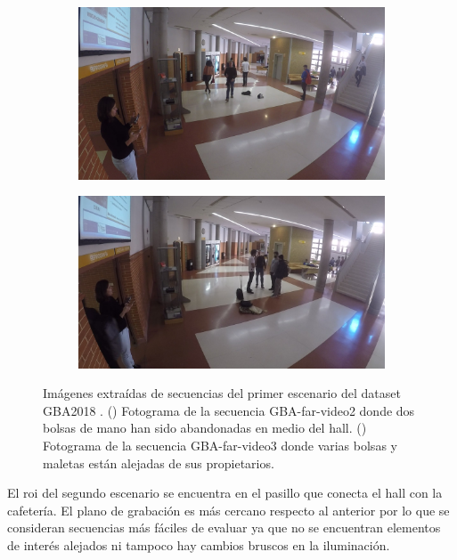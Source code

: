 \begin{figure}[ht!]
  \centering
  \begin{subfigure}[b]{0.4\textwidth}
    \includegraphics[width=\textwidth]{img/chapters/resultados/datasets/GBA_1.jpg}
    \caption{}
    \label{fig:GBA_1}
  \end{subfigure}
  \qquad\qquad
  \begin{subfigure}[b]{0.4\textwidth}
    \includegraphics[width=\textwidth]{img/chapters/resultados/datasets/GBA_2.jpg}
    \caption{}
    \label{fig:GBA_2}
  \end{subfigure}
  \caption{Imágenes extraídas de secuencias del primer escenario del dataset GBA2018 \cite{gba-dataset}.
    (\protect{}) Fotograma de la secuencia GBA-far-video2 donde dos bolsas de mano han sido abandonadas en medio del hall.
    (\protect{}) Fotograma de la secuencia GBA-far-video3 donde varias bolsas y maletas están alejadas de sus propietarios.}
  \label{fig:GBA1}
\end{figure}

El \gls{roi} del segundo escenario se encuentra en el pasillo que conecta el hall con la cafetería. El plano de grabación es más cercano respecto al anterior por lo que se consideran secuencias más fáciles de evaluar ya que no se encuentran elementos de interés alejados ni tampoco hay cambios bruscos en la iluminación.

